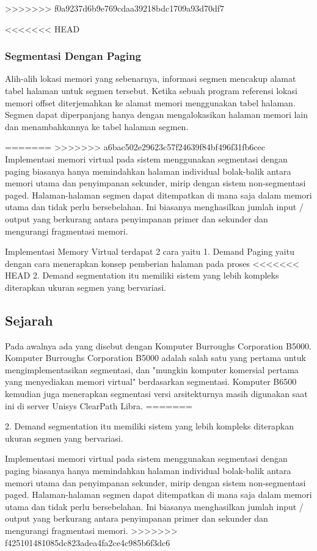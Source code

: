 >>>>>>> f0a9237d6b9e769cdaa39218bdc1709a93d70df7

<<<<<<< HEAD
\subsubsection {Segmentasi Dengan Paging}
Alih-alih lokasi memori yang sebenarnya, informasi segmen mencakup alamat tabel halaman untuk segmen tersebut. Ketika sebuah program referensi lokasi memori offset diterjemahkan ke alamat memori menggunakan tabel halaman. Segmen dapat diperpanjang hanya dengan mengalokasikan halaman memori lain dan menambahkannya ke tabel halaman segmen.

=======
>>>>>>> a6bac502e29623c57f24639f84bf496f31fb6cec
Implementasi memori virtual pada sistem menggunakan segmentasi dengan paging biasanya hanya memindahkan halaman individual bolak-balik antara memori utama dan penyimpanan sekunder, mirip dengan sistem non-segmentasi paged. Halaman-halaman segmen dapat ditempatkan di mana saja dalam memori utama dan tidak perlu bersebelahan. Ini biasanya menghasilkan jumlah input / output yang berkurang antara penyimpanan primer dan sekunder dan mengurangi fragmentasi memori.

Implementasi Memory Virtual terdapat 2 cara yaitu 
	1. Demand Paging yaitu dengan cara menerapkan konsep pemberian halaman pada proses
<<<<<<< HEAD
	2. Demand segmentation itu memiliki sistem yang lebih kompleks diterapkan ukuran segmen yang bervariasi.
\subsection{Sejarah}
Pada awalnya ada yang disebut dengan Komputer Burroughs Corporation B5000. Komputer Burroughs Corporation B5000 adalah salah satu yang pertama untuk mengimplementasikan segmentasi, dan "mungkin komputer komersial pertama yang menyediakan memori virtual" berdasarkan segmentasi. Komputer B6500 kemudian juga menerapkan segmentasi versi arsitekturnya masih digunakan saat ini di server Unisys ClearPath Libra.
=======
	
2. Demand segmentation itu memiliki sistem yang lebih kompleks diterapkan ukuran segmen yang bervariasi.

Implementasi memori virtual pada sistem menggunakan segmentasi dengan paging biasanya hanya memindahkan halaman individual bolak-balik antara memori utama dan penyimpanan sekunder, mirip dengan sistem non-segmentasi paged. Halaman-halaman segmen dapat ditempatkan di mana saja dalam memori utama dan tidak perlu bersebelahan. Ini biasanya menghasilkan jumlah input / output yang berkurang antara penyimpanan primer dan sekunder dan mengurangi fragmentasi memori.
>>>>>>> f425101481085dc823adea4fa2ce4c985b6f3dc6
